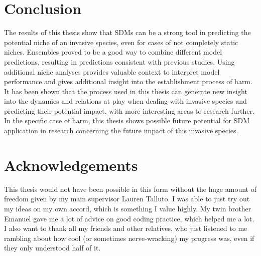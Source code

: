 \documentclass[12pt,a4paper]{article}
\begin{document}
\section{Conclusion} \label{sec:conclusion}
The results of this thesis show that SDMs can be a strong tool in predicting the potential niche of an invasive species, even for cases of not completely static niches.
Ensembles proved to be a good way to combine different model predictions, resulting in predictions consistent with previous studies.
Using additional niche analyses provides valuable context to interpret model performance and gives additional insight into the establishment process of \gls{harm}.
It has been shown that the process used in this thesis can generate new insight into the dynamics and relations at play when dealing with invasive species and predicting their potential impact, with more interesting areas to research further.
In the specific case of \gls{harm}, this thesis shows possible future potential for SDM application in research concerning the future impact of this invasive species.


\section{Acknowledgements} \label{sec:acknowledgements}
This thesis would not have been possible in this form without the huge amount of freedom given by my main supervisor Lauren Talluto.
I was able to just try out my ideas on my own accord, which is something I value highly.
My twin brother Emanuel gave me a lot of advice on good coding practice, which helped me a lot.
I also want to thank all my friends and other relatives, who just listened to me rambling about how cool (or sometimes nerve-wracking) my progress was, even if they only understood half of it.

\newpage
\printbibliography[]

\end{document}

